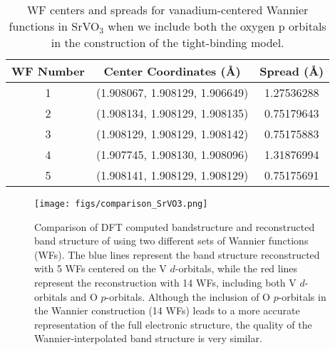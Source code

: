 \documentclass[%
 reprint,
 amsmath,amssymb,
 aps,
]{revtex4-2}
\begin{document}
\begin{table}[H]
\centering

\begin{tabular}{|c|c|c|}
\hline
\textbf{WF Number} & \textbf{Center Coordinates (Å)} & \textbf{Spread (Å)} \\ \hline
1 & (1.908067, 1.908129, 1.906649) & 1.27536288 \\ \hline
2 & (1.908134, 1.908129, 1.908135) & 0.75179643 \\ \hline
3 & (1.908129, 1.908129, 1.908142) & 0.75175883 \\ \hline
4 & (1.907745, 1.908130, 1.908096) & 1.31876994 \\ \hline
5 & (1.908141, 1.908129, 1.908129) & 0.75175691 \\ \hline
\end{tabular}
\caption{WF centers and spreads for vanadium-centered Wannier functions in SrVO\(_3\) when we include both the  oxygen p orbitals in the construction of the tight-binding model.}
 \label{table:wannier-centers-SrVO3-2}
\end{table}

\begin{figure}[H]
    \centering
    \texttt{[image: figs/comparison\_SrVO3.png]}
   \caption{
Comparison of DFT computed bandstructure and reconstructed band structure of  using two different sets of Wannier functions (WFs). The blue lines represent the band structure reconstructed with 5 WFs centered on the V \(d\)-orbitals, while the red lines represent the reconstruction with 14 WFs, including both V \(d\)-orbitals and O \(p\)-orbitals. Although the inclusion of O \(p\)-orbitals in the Wannier construction (14 WFs) leads to a more accurate representation of the full electronic structure, the quality of the Wannier-interpolated band structure is very similar. 
}
\label{fig:SrVO3-reconstructed-bandstructure}
\end{figure}
\end{document}

